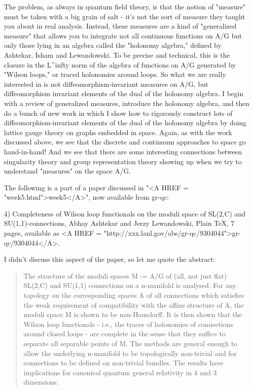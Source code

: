 The problem, as always in quantum field theory, is that the notion of
"measure" must be taken with a big grain of salt - it's not the sort of
measure they taught you about in real analysis.  Instead, these measures
are a kind of "generalized measure" that allows you to integrate not all
continuous functions on A/G but only those lying in an algebra called
the "holonomy algebra," defined by Ashtekar, Isham and Lewandowski.
To be precise and technical, this is the closure in the L^infty norm of
the algebra of functions on A/G generated by "Wilson loops," or traced
holonomies around loops.   So what we are really interested in is not
diffeomorphism-invariant measures on A/G, but diffeomorphism invariant
elements of the dual of the holonomy algebra.  I begin with a review of
generalized measures, introduce the holonomy algebra, and then do a
bunch of new work in which I show how to rigorously construct lots 
of diffeomorphism-invariant elements of the dual of the holonomy algebra
by doing lattice gauge theory on graphs embedded in space.  Again, as
with the work discussed above, we see that the discrete and continuum
approaches to space go hand-in-hand!  And we see that there are some
interesting connections between singularity theory and group
representation theory showing up when we try to understand "measures" on
the space A/G.  


The following is a part of a paper discussed in "<A HREF = "week5.html">week5</A>", now available
from gr-qc:

4)  Completeness of Wilson loop functionals on the moduli space of
SL(2,C) and SU(1,1)-connections, Abhay Ashtekar and Jerzy Lewandowski,
Plain TeX, 7 pages, available as <A HREF = "http://xxx.lanl.gov/abs/gr-qc/9304044">gr-qc/9304044</A>.  

I didn't discuss this aspect of the paper, so let me quote the abstract:

\begin{quote}
The structure of the moduli spaces M := A/G of (all, not just
flat) SL(2,C) and SU(1,1) connections on a n-manifold is analysed.
For any topology on the corresponding spaces A of all connections
which satisfies the weak requirement of compatibility with the affine
structure of A, the moduli space M is shown to be non-Hausdorff.
It is then shown that the Wilson loop functionals - i.e., the traces
of holonomies of connections around closed loops - are complete in the
sense that they suffice to separate all separable points of M. The
methods are general enough to allow the underlying n-manifold to be
topologically non-trivial and for connections to be defined on
non-trivial bundles. The results have implications for canonical
quantum general relativity in 4 and 3 dimensions.
\end{quote}

